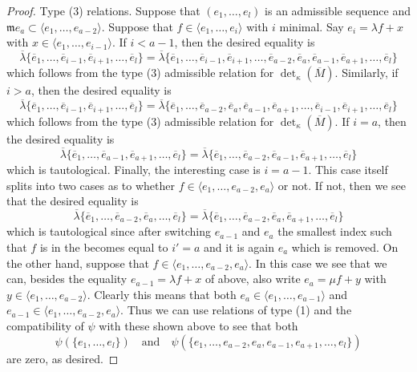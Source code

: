 \begin{proof}
\medskip\noindent
Type (3) relations. Suppose that $(e_1, \ldots, e_l)$
is an admissible sequence and
$\mathfrak m e_a \subset \langle e_1, \ldots, e_{a - 2}\rangle$.
Suppose that $f \in \langle e_1, \ldots, e_i\rangle$ with $i$ minimal.
Say $e_i = \lambda f + x$ with $x \in \langle e_1, \ldots, e_{i - 1}\rangle$.
If $i < a - 1$, then the desired equality is
$$
\overline{\lambda}
\{\overline{e}_1,
\ldots,
\overline{e}_{i - 1},
\overline{e}_{i + 1},
\ldots,
\overline{e}_l\}
=
\overline{\lambda}
\{\overline{e}_1,
\ldots,
\overline{e}_{i - 1},
\overline{e}_{i + 1},
\ldots,
\overline{e}_{a - 2},
\overline{e}_a,
\overline{e}_{a - 1},
\overline{e}_{a + 1},
\ldots,
\overline{e}_l\}
$$
which follows from the type (3) admissible relation for
$\det_\kappa(\overline{M})$. Similarly, if $i > a$, then the
desired equality is
$$
\overline{\lambda}
\{\overline{e}_1,
\ldots,
\overline{e}_{i - 1},
\overline{e}_{i + 1},
\ldots,
\overline{e}_l\}
=
\overline{\lambda}
\{\overline{e}_1,
\ldots,
\overline{e}_{a - 2},
\overline{e}_a,
\overline{e}_{a - 1},
\overline{e}_{a + 1},
\ldots,
\overline{e}_{i - 1},
\overline{e}_{i + 1},
\ldots,
\overline{e}_l\}
$$
which follows from the type (3) admissible relation for
$\det_\kappa(\overline{M})$. If $i = a$, then the desired
equality is
$$
\overline{\lambda}
\{\overline{e}_1,
\ldots,
\overline{e}_{a - 1},
\overline{e}_{a + 1},
\ldots,
\overline{e}_l\}
=
\overline{\lambda}
\{\overline{e}_1,
\ldots,
\overline{e}_{a - 2},
\overline{e}_{a - 1},
\overline{e}_{a + 1},
\ldots,
\overline{e}_l\}
$$
which is tautological. Finally, the interesting case is $i = a - 1$.
This case itself splits into two cases as to whether
$f \in \langle e_1, \ldots, e_{a - 2}, e_a \rangle$ or not.
If not, then we see that the desired equality is
$$
\overline{\lambda}
\{\overline{e}_1,
\ldots,
\overline{e}_{a - 2},
\overline{e}_a,
\ldots,
\overline{e}_l\}
=
\overline{\lambda}
\{\overline{e}_1,
\ldots,
\overline{e}_{a - 2},
\overline{e}_a,
\overline{e}_{a + 1},
\ldots,
\overline{e}_l\}
$$
which is tautological since after switching $e_{a - 1}$ and $e_a$
the smallest index such that $f$ is in the becomes equal to
$i' = a$ and it is again $e_a$ which is removed. On the other
hand, suppose that $f \in \langle e_1, \ldots, e_{a - 2}, e_a \rangle$.
In this case we see that we can, besides the equality
$e_{a - 1} = \lambda f + x$ of above, also write
$e_a = \mu f + y$ with $y \in \langle e_1, \ldots, e_{a - 2}\rangle$.
Clearly this means that both
$e_a \in \langle e_1, \ldots, e_{a - 1} \rangle$ and
$e_{a - 1} \in \langle e_1, \ldots, e_{a - 2}, e_a\rangle$.
Thus we can use relations of type (1) and the compatibility of $\psi$
with these shown above to see that both
$$
\psi(\{e_1, \ldots, e_l\})
\quad\text{and}\quad
\psi(\{e_1, \ldots, e_{a - 2}, e_a, e_{a - 1}, e_{a + 1}, \ldots, e_l\})
$$
are zero, as desired.


\end{proof}
